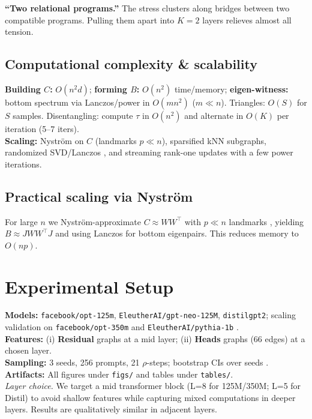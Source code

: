 \documentclass[11pt]{article}
\newcommand{\1}{\mathbf{1}}
\begin{document}
\begin{tcolorbox}[colback=blue!3,colframe=blue!40!black,title=Intuition (for \S\ref{sec:k2})]
\textbf{``Two relational programs.''} The stress clusters along bridges between two compatible programs. Pulling them apart into $K{=}2$ layers relieves almost all tension.
\end{tcolorbox}

\subsection{Computational complexity \& scalability}
\textbf{Building $C$:} $O(n^2d)$; \textbf{forming $B$:} $O(n^2)$ time/memory; \textbf{eigen-witness:} bottom spectrum via Lanczos/power in $O(mn^2)$ ($m\!\ll\!n$). Triangles: $O(S)$ for $S$ samples. Disentangling: compute $\tau$ in $O(n^2)$ and alternate in $O(K)$ per iteration (5--7 iters).\\
\textbf{Scaling:} Nyström on $C$ (landmarks $p\!\ll\!n$), sparsified kNN subgraphs, randomized SVD/Lanczos \citep{halko2011}, and streaming rank-one updates with a few power iterations.

\subsection{Practical scaling via Nyström}\label{sec:nystrom}
For large $n$ we Nyström-approximate $C\approx W W^\top$ with $p\ll n$ landmarks \citep{williams2001nystrom,Fowlkes2004}, yielding $B\approx J W W^\top J$ and using Lanczos for bottom eigenpairs. This reduces memory to $O(np)$.

\section{Experimental Setup}
\textbf{Models:} \texttt{facebook/opt-125m}, \texttt{EleutherAI/gpt-neo-125M}, \texttt{distilgpt2}; scaling validation on \texttt{facebook/opt-350m} and \texttt{EleutherAI/pythia-1b} \citep{Zhang2022OPT,Biderman2023Pythia,Radford2019GPT2,Vaswani2017}.\\
\textbf{Features:} (i) \textbf{Residual} graphs at a mid layer; (ii) \textbf{Heads} graphs (66 edges) at a chosen layer.\\
\textbf{Sampling:} 3 seeds, 256 prompts, 21 $\rho$-steps; bootstrap CIs over seeds \citep{Efron1979}.\\
\textbf{Artifacts:} All figures under \texttt{figs/} and tables under \texttt{tables/}.\\[0.25em]
\textit{Layer choice.} We target a mid transformer block (L=8 for 125M/350M; L=5 for Distil) to avoid shallow features while capturing mixed computations in deeper layers. Results are qualitatively similar in adjacent layers.
\end{document}
